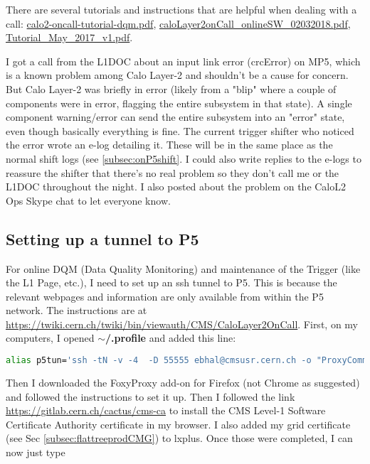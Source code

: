 There are several tutorials and instructions that are helpful when dealing with a call: \href{run:./sec33/calo2-oncall-tutorial-dqm.pdf}{calo2-oncall-tutorial-dqm.pdf}, \href{run:./sec33/caloLayer2onCall_onlineSW_02032018.pdf}{caloLayer2onCall\_onlineSW\_02032018.pdf}, \href{run:./sec33/Tutorial_May_2017_v1.pdf}{Tutorial\_May\_2017\_v1.pdf}.

I got a call from the L1DOC about an input link error (crcError) on MP5, which is a known problem among Calo Layer-2 and shouldn't be a cause for concern. But Calo Layer-2 was briefly in error (likely from a "blip" where a couple of components were in error, flagging the entire subsystem in that state). A single component warning/error can send the entire subsystem into an "error" state, even though basically everything is fine. The current trigger shifter who noticed the error wrote an e-log detailing it. These will be in the same place as the normal shift logs (see \ref{subsec:onP5shift}. I could also write replies to the e-logs to reassure the shifter that there's no real problem so they don't call me or the L1DOC throughout the night. I also posted about the problem on the CaloL2 Ops Skype chat to let everyone know.


\subsection{Setting up a tunnel to P5}

For online DQM (Data Quality Monitoring) and maintenance of the Trigger (like the L1 Page, etc.), I need to set up an ssh tunnel to P5. This is because the relevant webpages and information are only available from within the P5 network. The instructions are at \url{https://twiki.cern.ch/twiki/bin/viewauth/CMS/CaloLayer2OnCall}. First, on my computers, I opened \textbf{$\sim$/.profile} and added this line:

\begin{lstlisting}[belowskip=-0.7cm, language=sh, numbers=none]
alias p5tun='ssh -tN -v -4  -D 55555 ebhal@cmsusr.cern.ch -o "ProxyCommand=ssh ebhal@lxplus.cern.ch -W %h:%p"'
\end{lstlisting}

Then I downloaded the FoxyProxy add-on for Firefox (not Chrome as suggested) and followed the instructions to set it up. Then I followed the link \url{https://gitlab.cern.ch/cactus/cms-ca} to install the CMS Level-1 Software Certificate Authority certificate in my browser. I also added my grid certificate (see Sec \ref{subsec:flattreeprodCMG}) to lxplus. Once those were completed, I can now just type

